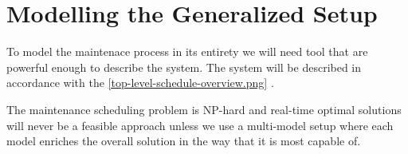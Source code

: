 \chapter{Modelling the Generalized Setup}
To model the maintenace process in its entirety we will need tool that are powerful enough to describe the system. The system will be described in accordance 
with the \ref{top-level-schedule-overview.png} \cite{palmer_maintenance_2019}.

The maintenance scheduling problem is NP-hard and real-time optimal solutions will never be a feasible approach unless we use a multi-model setup where each model enriches the 
overall solution in the way that it is most capable of. 
